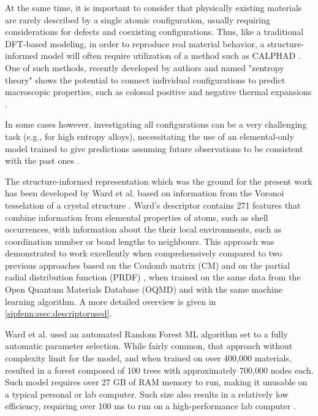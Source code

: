 At the same time, it is important to consider that physically existing materials are rarely described by a single atomic configuration, usually requiring considerations for defects and coexisting configurations. Thus, like a traditional DFT-based modeling, in order to reproduce real material behavior, a structure-informed model will often require utilization of a method such as CALPHAD \cite{Kaufman1970ComputerMetals, Liu2018OceanLearning}. One of such methods, recently developed by authors and named "zentropy theory" shows the potential to connect individual configurations to predict macroscopic properties, such as colossal positive and negative thermal expansions \cite{Liu2022ZentropyExpansion}.

In some cases however, investigating all configurations can be a very challenging task (e.g., for high entropy alloys), necessitating the use of an elemental-only model trained to give predictions assuming future observations to be consistent with the past ones \cite{Debnath2021GenerativeAlloys}. 

\label{sipfenn:ssec:specificapproach}

The structure-informed representation which was the ground for the present work has been developed by Ward et al. based on information from the Voronoi tesselation of a crystal structure \cite{Ward2017IncludingTessellations}. Ward's descriptor contains 271 features that combine information from elemental properties of atoms, such as shell occurrences, with information about the their local environments, such as coordination number or bond lengths to neighbours. This approach was demonstrated to work excellently when comprehensively compared to two previous approaches based on the Coulomb matrix (CM) \cite{Schutt2014HowProperties} and on the partial radial distribution function (PRDF) \cite{Seko2017RepresentationProperties}, when trained on the same data from the Open Quantum Materials Database (OQMD) and with the same machine learning algorithm. A more detailed overview is given in \ref{sipfenn:ssec:descriptorused}.

Ward et al. used an automated Random Forest ML algorithm \cite{Ward2017IncludingTessellations} set to a fully automatic parameter selection. While fairly common, that approach without complexity limit for the model, and when trained on over 400,000 materials, resulted in a forest composed of 100 trees with approximately 700,000 nodes each. Such model requires over 27 GB of RAM memory to run, making it unusable on a typical personal or lab computer. Such size also results in a relatively low efficiency, requiring over 100 ms to run on a high-performance lab computer \cite{Ward2017IncludingTessellations}.

